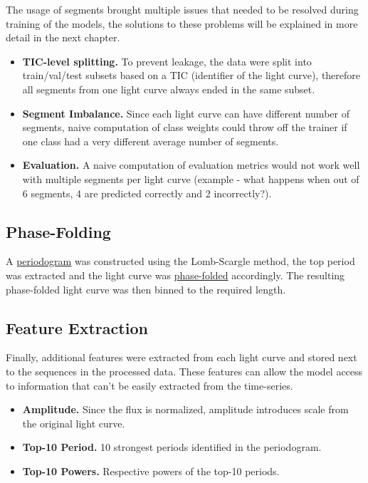 The usage of segments brought multiple issues that needed to be resolved during training of the models, the solutions to these problems will be explained in more detail in the next chapter.

\begin{itemize}
    \item \textbf{TIC-level splitting.} To prevent leakage, the data were split into \linebreak train/val/test subsets based on a TIC (identifier of the light curve), therefore all segments from one light curve always ended in the same subset.
    \item \textbf{Segment Imbalance.} Since each light curve can have different number of segments, naive computation of class weights could throw off the trainer if one class had a very different average number of segments.
    \item \textbf{Evaluation.} A naive computation of evaluation metrics would not work well with multiple segments per light curve (example - what happens when out of 6 segments, 4 are predicted correctly and 2 incorrectly?).
\end{itemize}

\subsection{Phase-Folding}

A \hyperref[subsec:02-periodogram]{periodogram} was constructed using the Lomb-Scargle \parencite{Lomb1976} method, the top period was extracted and the light curve was \hyperref[subsec:02-phase-folded-light-curve]{phase-folded} accordingly.
The resulting phase-folded light curve was then binned to the required length.

\subsection{Feature Extraction}

Finally, additional features were extracted from each light curve and stored next to the sequences in the processed data.
These features can allow the model access to information that can't be easily extracted from the time-series.

\begin{itemize}
    \item \textbf{Amplitude.} Since the flux is normalized, amplitude introduces scale from the original light curve.
    \item \textbf{Top-10 Period.} 10 strongest periods identified in the periodogram.
    \item \textbf{Top-10 Powers.} Respective powers of the top-10 periods.
\end{itemize}

